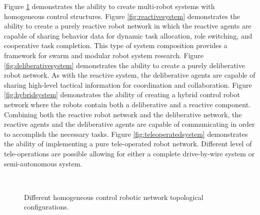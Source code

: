     Figure \ref{fig:homo_conf} demonstrates the ability to create multi-robot
      systems with homogeneous control structures.
    Figure \ref{fig:reactivesystem} demonstrates the ability to create a purely 
      reactive robot network in which the reactive agents are capable of sharing
      behavior data for dynamic task allocation, role switching, and cooperative
      task completion. 
    This type of system composition provides a framework for swarm and modular 
      robot system research.
    Figure \ref{fig:deliberativesystem} demonstrates the ability to create a 
      purely deliberative robot network.
    As with the reactive system, the deliberative agents are capable of sharing 
      high-level tactical information for coordination and collaboration. 
     Figure \ref{fig:hybridsystem} demonstrates the ability of creating a 
      hybrid control robot network where the robots contain both a deliberative
      and a reactive component.
    Combining both the reactive robot network and the deliberative network, the 
      reactive agents and the deliberative agents are capable of communicating 
      in order to accomplish the necessary tasks.
    Figure \ref{fig:teleoperatedsystem} demonstrates the ability of 
      implementing a pure tele-operated robot network.
    Different level of tele-operations are possible allowing for either a
      complete drive-by-wire system or semi-autonomous system.
    \begin{figure}%
    \begin{center}
       \\
    \end{center}
    \caption{Different homogeneous control robotic network topological configurations.}
    \label{fig:homo_conf}
    \end{figure}

